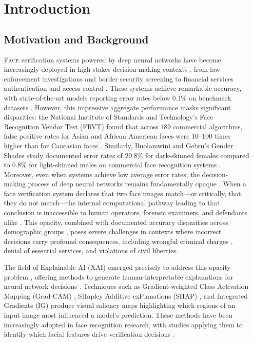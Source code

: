 \chapter{Introduction}
\label{ch:introduction}

\section{Motivation and Background}
\label{sec:motivation}

\lettrine[lines=2,slope=4pt,findent=-3pt]{F}{ace} verification systems powered by deep neural networks have become increasingly deployed in high-stakes decision-making contexts \cite{garvie2016perpetual}, from law enforcement investigations and border security screening to financial services authentication and access control \cite{grother2019frvt}. These systems achieve remarkable accuracy, with state-of-the-art models reporting error rates below 0.1\% on benchmark datasets \cite{deng2019arcface,wang2018cosface}. However, this impressive aggregate performance masks significant disparities: the National Institute of Standards and Technology's Face Recognition Vendor Test (FRVT) found that across 189 commercial algorithms, false positive rates for Asian and African American faces were 10--100 times higher than for Caucasian faces \cite{grother2019frvt}. Similarly, Buolamwini and Gebru's Gender Shades study documented error rates of 20.8\% for dark-skinned females compared to 0.8\% for light-skinned males on commercial face recognition systems \cite{buolamwini2018gender}. Moreover, even when systems achieve low average error rates, the decision-making process of deep neural networks remains fundamentally opaque \cite{lipton2018mythos,castelvecchi2016blackbox}. When a face verification system declares that two face images match---or critically, that they do not match---the internal computational pathway leading to that conclusion is inaccessible to human operators, forensic examiners, and defendants alike \cite{rudin2019stop}. This opacity, combined with documented accuracy disparities across demographic groups \cite{klare2012demographic,phillips2011intro,buolamwini2018gender}, poses severe challenges in contexts where incorrect decisions carry profound consequences, including wrongful criminal charges \cite{hill2020detroit,hill2023pregnant,parks2019wrongful}, denial of essential services, and violations of civil liberties.

The field of Explainable AI (XAI) emerged precisely to address this opacity problem \cite{gunning2017xai,doshivelez2017rigorous}, offering methods to generate human-interpretable explanations for neural network decisions \cite{adadi2018peeking}. Techniques such as Gradient-weighted Class Activation Mapping (Grad-CAM) \cite{selvaraju2019gradcam}, SHapley Additive exPlanations (SHAP) \cite{lundberg2017unified}, and Integrated Gradients (IG) \cite{Sundararajan2017_IG} produce visual saliency maps highlighting which regions of an input image most influenced a model's prediction. These methods have been increasingly adopted in face recognition research, with studies applying them to identify which facial features drive verification decisions \cite{Lin2021_xCos,dhar2021understanding,wang2021survey}.

